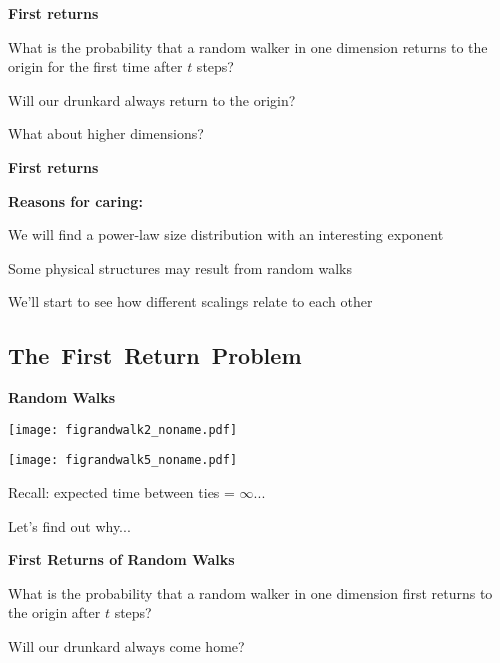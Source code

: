   \textbf{First returns}

  What is the probability that a random walker
  in one dimension returns to the origin
  for the first time after $t$ steps?

  Will our drunkard always return to the origin?

  What about higher dimensions?


  \textbf{First returns}

  \textbf{Reasons for caring:}
    
     
      We will find a power-law size distribution
      with an interesting exponent
     
      Some physical structures may result from random walks
     
      We'll start to see how different scalings relate to each other
    
  



\subsection{The\ First\ Return\ Problem}

  \textbf{Random Walks}

  \texttt{[image: figrandwalk2\_noname.pdf]}

  \texttt{[image: figrandwalk5\_noname.pdf]}

  {
  Recall: expected time between ties = $\infty$...

  Let's find out why...\cite{feller1968a}}




  \textbf{First Returns of Random Walks}

  

    What is the probability that a random walker
    in one dimension \alert{first returns} to the origin
    after $t$ steps?

   Will our drunkard always come home?


